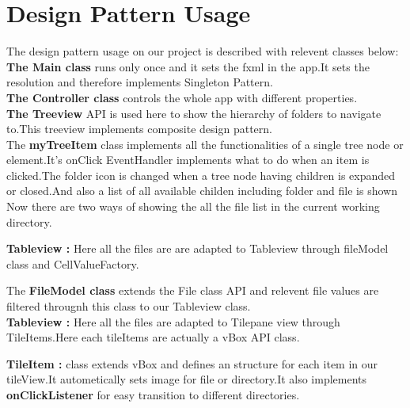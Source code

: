 \documentclass[10pt]{article}
\begin{document}
 \newpage
 
 





\section {Design Pattern Usage	}


The design pattern usage on our project is described with relevent classes below:\\


{\bfseries The Main class} runs only once and it sets the fxml in the app.It sets the resolution and therefore implements Singleton Pattern.\\

{\bfseries The Controller class} controls the whole app with different properties.\\


{\bfseries The Treeview} API is used here to show the hierarchy of folders to navigate to.This treeview implements composite design pattern.\\



The {\bfseries myTreeItem} class implements all the functionalities of a single tree node or element.It's onClick EventHandler implements what to do when an item is clicked.The folder icon is changed when a tree node having children is expanded or closed.And also a list of all available childen including folder and file is shown\\

Now there are two ways of showing the all the file list in the current working directory.

{\bfseries Tableview :} Here all the files are are adapted to Tableview through fileModel class and CellValueFactory.

The {\bfseries FileModel class} extends the File class API and relevent file values are filtered througnh this class to our Tableview class.\\

{\bfseries Tableview :} Here all the files are adapted to Tilepane view through TileItems.Here each tileItems are actually a vBox API class.

{\bfseries TileItem :} class extends vBox and defines an structure for each item in our tileView.It autometically sets image for file or directory.It also implements {\bfseries onClickListener} for easy transition to different directories.\\
\end{document}

